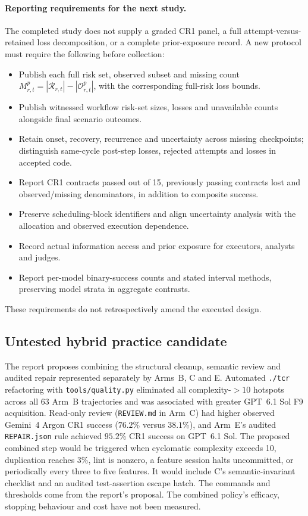 \paragraph{Reporting requirements for the next study.}
The completed study does not supply a graded CR1 panel, a full
attempt-versus-retained loss decomposition, or a complete prior-exposure
record. A new protocol must require the following before collection:
\begin{itemize}[leftmargin=*]
\item Publish each full risk set, observed subset and missing count
$M^p_{r,t}=|\mathcal{R}_{r,t}|-|\mathcal{O}^p_{r,t}|$, with the
corresponding full-risk loss bounds.
\item Publish witnessed workflow risk-set sizes, losses and unavailable
counts alongside final scenario outcomes.
\item Retain onset, recovery, recurrence and uncertainty across missing
checkpoints; distinguish same-cycle post-step losses, rejected attempts
and losses in accepted code.
\item Report CR1 contracts passed out of 15, previously passing contracts
lost and observed/missing denominators, in addition to composite success.
\item Preserve scheduling-block identifiers and align uncertainty analysis
with the allocation and observed execution dependence.
\item Record actual information access and prior exposure for executors,
analysts and judges.
\item Report per-model binary-success counts and stated interval methods,
preserving model strata in aggregate contrasts.
\end{itemize}
These requirements do not retrospectively amend the executed design.

\subsection{Untested hybrid practice candidate}\label{app:practicecandidate}

The report proposes combining the structural cleanup, semantic review and
audited repair represented separately by Arms~B, C and E.
Automated \texttt{./tcr} refactoring with \nolinkurl{tools/quality.py}
eliminated all complexity-$>10$ hotspots across all 63 Arm~B trajectories
and was associated with greater GPT~6.1 Sol F9 acquisition. Read-only review
(\texttt{REVIEW.md} in Arm~C) had higher observed Gemini~4 Argon CR1 success
($76.2\%$ versus $38.1\%$), and Arm~E's audited
\texttt{REPAIR.json} rule achieved $95.2\%$ CR1 success on GPT~6.1 Sol.
The proposed combined step would be triggered when cyclomatic complexity
exceeds 10, duplication reaches $3\%$, lint is nonzero, a feature session
halts uncommitted, or periodically every three to five features. It would
include C's semantic-invariant checklist and an audited test-assertion
escape hatch. The commands and thresholds come from the report's proposal. The combined
policy's efficacy, stopping behaviour and cost have not been measured.
